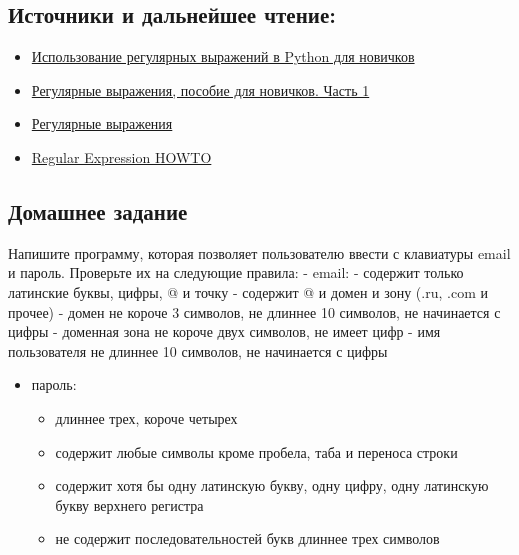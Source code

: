 \documentclass[11pt]{article}
\begin{document}
    \subsection{Источники и дальнейшее
чтение:}\label{ux438ux441ux442ux43eux447ux43dux438ux43aux438-ux438-ux434ux430ux43bux44cux43dux435ux439ux448ux435ux435-ux447ux442ux435ux43dux438ux435}

\begin{itemize}
\itemsep1pt\parskip0pt
\item
  \href{http://tproger.ru/translations/regular-expression-python/}{Использование
  регулярных выражений в Python для новичков}
\item
  \href{https://habrahabr.ru/post/115825/}{Регулярные выражения, пособие
  для новичков. Часть 1}
\item
  \href{http://pep8.ru/doc/dive-into-python-3/7.html}{Регулярные
  выражения}
\item
  \href{https://docs.python.org/3/howto/regex.html}{Regular Expression
  HOWTO}
\end{itemize}

\subsection{Домашнее
задание}\label{ux434ux43eux43cux430ux448ux43dux435ux435-ux437ux430ux434ux430ux43dux438ux435}

Напишите программу, которая позволяет пользователю ввести с клавиатуры
email и пароль. Проверьте их на следующие правила: - email: - содержит
только латинские буквы, цифры, @ и точку - содержит @ и домен и зону
(.ru, .com и прочее) - домен не короче 3 символов, не длиннее 10
символов, не начинается с цифры - доменная зона не короче двух символов,
не имеет цифр - имя пользователя не длиннее 10 символов, не начинается с
цифры

\begin{itemize}
\itemsep1pt\parskip0pt
\item
  пароль:

  \begin{itemize}
  \itemsep1pt\parskip0pt
  \item
    длиннее трех, короче четырех
  \item
    содержит любые символы кроме пробела, таба и переноса строки
  \item
    содержит хотя бы одну латинскую букву, одну цифру, одну латинскую
    букву верхнего регистра
  \item
    не содержит последовательностей букв длиннее трех символов
  \end{itemize}
\end{itemize}
\end{document}
